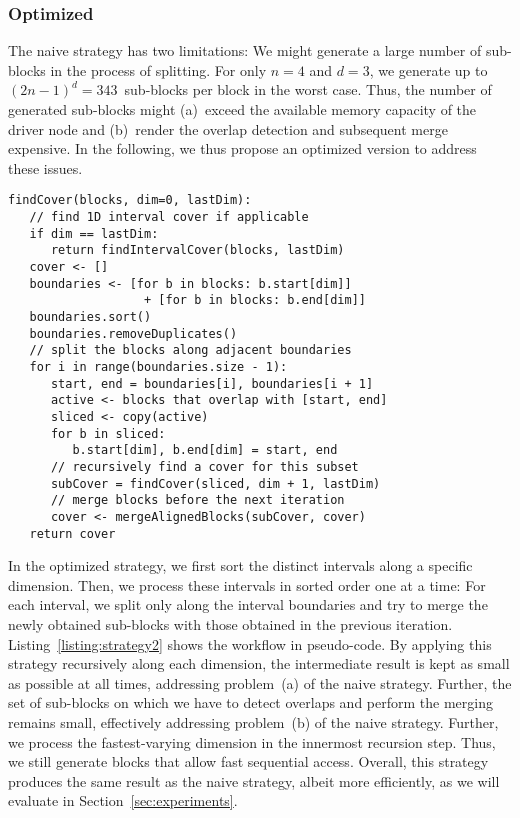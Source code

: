 \documentclass[conference]{IEEEtran}
\begin{document}
\subsubsection{Optimized}
\label{sssec:strategy2}

The naive strategy has two limitations: We might generate a large number of sub-blocks in the process of splitting. For only $n=4$ and $d=3$, we generate up to $(2n - 1)^d = 343$~sub-blocks per block in the worst case. Thus, the number of generated sub-blocks might (a)~exceed the available memory capacity of the driver node and (b)~render the overlap detection and subsequent merge expensive. In the following, we thus propose an optimized version to address these issues. 
\begin{lstlisting}[style=pseudo, caption={Pseudo-code of the optimized strategy.}, label={listing:strategy2}, xleftmargin=4.0ex]
findCover(blocks, dim=0, lastDim):
   // find 1D interval cover if applicable
   if dim == lastDim:
      return findIntervalCover(blocks, lastDim)
   cover <- []
   boundaries <- [for b in blocks: b.start[dim]] 
                   + [for b in blocks: b.end[dim]]
   boundaries.sort()
   boundaries.removeDuplicates()
   // split the blocks along adjacent boundaries
   for i in range(boundaries.size - 1):
      start, end = boundaries[i], boundaries[i + 1]
      active <- blocks that overlap with [start, end]
      sliced <- copy(active)
      for b in sliced:
         b.start[dim], b.end[dim] = start, end
      // recursively find a cover for this subset
      subCover = findCover(sliced, dim + 1, lastDim)
      // merge blocks before the next iteration
      cover <- mergeAlignedBlocks(subCover, cover)
   return cover
\end{lstlisting}
In the optimized strategy, we first sort the distinct intervals along a specific dimension. Then, we process these intervals in sorted order one at a time: For each interval, we split only along the interval boundaries and try to merge the newly obtained sub-blocks with those obtained in the previous iteration. Listing~\ref{listing:strategy2} shows the workflow in pseudo-code. 
By applying this strategy recursively along each dimension, the intermediate result is kept as small as possible at all times, addressing problem~(a) of the naive strategy. Further, the set of sub-blocks on which we have to detect overlaps and perform the merging remains small, effectively addressing problem~(b) of the naive strategy.  
Further, we process the fastest-varying dimension in the innermost recursion step. Thus, we still generate blocks that allow fast sequential access. Overall, this strategy produces the same result as the naive strategy, albeit more efficiently, as we will evaluate in Section~\ref{sec:experiments}.
\end{document}
